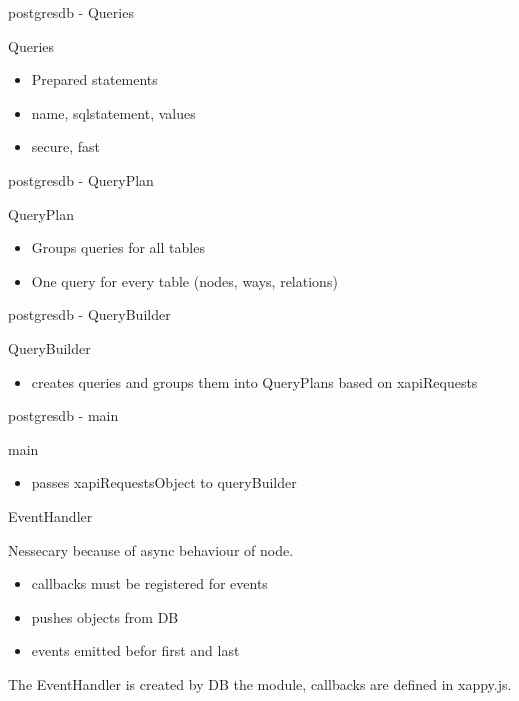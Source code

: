 \documentclass{beamer}
\begin{document}
\begin{frame}{postgresdb - Queries}
    \begin{block}{Queries}
        \begin{itemize}
            \item Prepared statements
            \item name, sqlstatement, values
            \item secure, fast
        \end{itemize}
    \end{block}
\end{frame}
\begin{frame}{postgresdb - QueryPlan}
    \begin{block}{QueryPlan}
        \begin{itemize}
            \item Groups queries for all tables
            \item One query for every table (nodes, ways, relations)
        \end{itemize}
    \end{block}
\end{frame}
\begin{frame}{postgresdb - QueryBuilder}
    \begin{block}{QueryBuilder}
        \begin{itemize}
            \item creates queries and groups them into QueryPlans based on xapiRequests
        \end{itemize}
    \end{block}
\end{frame}
\begin{frame}{postgresdb - main}
    \begin{block}{main}
        \begin{itemize}
            \item passes xapiRequestsObject to queryBuilder
        \end{itemize}
    \end{block}
\end{frame}

\begin{frame}{EventHandler}

    Nessecary because of async behaviour of node.

    \begin{itemize}
        \item callbacks must be registered for events
        \item pushes objects from DB
        \item events emitted befor first and last
    \end{itemize}

    The EventHandler is created by DB the module, callbacks are defined in xappy.js.

\end{frame}


\end{document}
